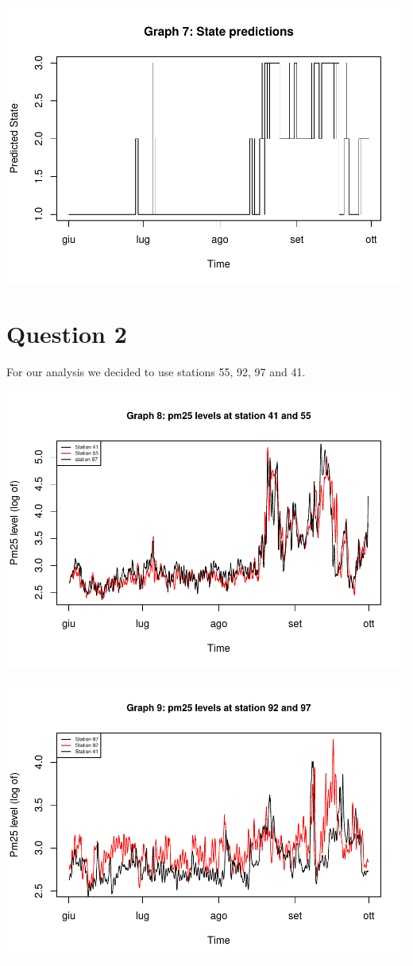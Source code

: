 \documentclass[
]{article}
\begin{document}
\begin{center}\includegraphics[width=1\linewidth,height=0.75\textheight]{finalproject_files/figure-latex/unnamed-chunk-2-1} \end{center}

\hypertarget{question-2}{%
\section{Question 2}\label{question-2}}

For our analysis we decided to use stations 55, 92, 97 and 41.

\begin{center}\includegraphics[width=0.75\linewidth,height=0.75\textheight]{finalproject_files/figure-latex/Graph 8-1} \end{center}

\begin{center}\includegraphics[width=0.75\linewidth,height=0.75\textheight]{finalproject_files/figure-latex/Graph 9-1} \end{center}
\end{document}
